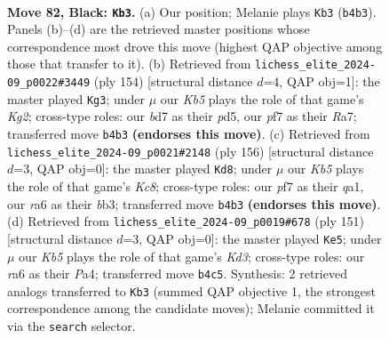 \documentclass[11pt]{article}
\begin{document}
\clearpage

\begin{figure}[p]\centering
\begin{subfigure}{0.46\textwidth}\centering
\resizebox{\linewidth}{!}{%
\newchessgame
\chessboard[
  setfen={8/3B1P2/R7/8/1k5P/8/8/7K b - - 8 82},
  showmover=false,
  pgfstyle=straightmove, color=movearrow, markmove={b4-b3}
]}
\caption{}
\end{subfigure}\hfill
\begin{subfigure}{0.46\textwidth}\centering
\resizebox{\linewidth}{!}{%
\newchessgame
\chessboard[
  setfen={8/R7/8/3p4/8/3k4/6K1/2r5 w - - 41 78},
  showmover=false,
  pgfstyle=straightmove, color=movearrow, markmove={g2-g3}
]}
\caption{}
\end{subfigure}
\\[4pt]
\begin{subfigure}{0.46\textwidth}\centering
\resizebox{\linewidth}{!}{%
\newchessgame
\chessboard[
  setfen={2K5/8/2k5/8/5p1p/1b6/8/q7 w - - 0 79},
  showmover=false,
  pgfstyle=straightmove, color=movearrow, markmove={c8-d8}
]}
\caption{}
\end{subfigure}\hfill
\begin{subfigure}{0.46\textwidth}\centering
\resizebox{\linewidth}{!}{%
\newchessgame
\chessboard[
  setfen={8/BP3K2/3k4/8/p7/P7/8/8 b - - 2 76},
  showmover=false,
  pgfstyle=straightmove, color=movearrow, markmove={d6-e5}
]}
\caption{}
\end{subfigure}
\caption{\textbf{Move 82, Black: \texttt{Kb3}.} (a) Our position; Melanie plays \texttt{Kb3} (\texttt{b4b3}). Panels (b)--(d) are the retrieved master positions whose correspondence most drove this move (highest QAP objective among those that transfer to it). (b) Retrieved from \texttt{lichess\_elite\_2024-09\_p0022\#3449} (ply 154) [structural distance $d$=4, QAP obj=1]: the master played \texttt{Kg3}; under $\mu$ our \emph{Kb5} plays the role of that game's \emph{Kg2}; cross-type roles: our \emph{b}d7 as their \emph{p}d5, our \emph{p}f7 as their \emph{R}a7; transferred move \texttt{b4b3} \textbf{(endorses this move)}. (c) Retrieved from \texttt{lichess\_elite\_2024-09\_p0021\#2148} (ply 156) [structural distance $d$=3, QAP obj=0]: the master played \texttt{Kd8}; under $\mu$ our \emph{Kb5} plays the role of that game's \emph{Kc8}; cross-type roles: our \emph{p}f7 as their \emph{q}a1, our \emph{r}a6 as their \emph{b}b3; transferred move \texttt{b4b3} \textbf{(endorses this move)}. (d) Retrieved from \texttt{lichess\_elite\_2024-09\_p0019\#678} (ply 151) [structural distance $d$=3, QAP obj=0]: the master played \texttt{Ke5}; under $\mu$ our \emph{Kb5} plays the role of that game's \emph{Kd3}; cross-type roles: our \emph{r}a6 as their \emph{P}a4; transferred move \texttt{b4c5}. Synthesis: 2 retrieved analogs transferred to \texttt{Kb3} (summed QAP objective 1, the strongest correspondence among the candidate moves); Melanie committed it via the \texttt{search} selector.}
\label{fig:thought-m163}
\end{figure}
\end{document}
